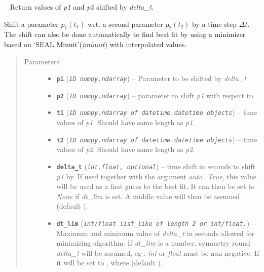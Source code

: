 \documentclass[letterpaper,10pt,english]{sphinxhowto}
\begin{document}

\begin{fulllineitems}
\label{swtools_doc:swtools.shift_param}~\label{swtools_doc:shift-param}
Return values of \emph{p1} and \emph{p2} shifted by \emph{delta\_t}.

Shift a parameter \(p_1(t_1)\) wrt. a second parameter
\(p_2(t_2)\) by a time step \(\Delta t\). The shift can
also be done automatically to find best fit by using a minimizer
based on `SEAL Minuit'(\emph{iminuit}) with interpolated values.
\begin{quote}\begin{description}
\item[{Parameters}] \leavevmode\begin{itemize}
\item {} 
\textbf{\texttt{p1}} (\emph{\texttt{1D numpy.ndarray}}) -- Parameter to be shifted by \emph{delta\_t}

\item {} 
\textbf{\texttt{p2}} (\emph{\texttt{1D numpy.ndarray}}) -- parameter to shift \emph{p1} with respect to.

\item {} 
\textbf{\texttt{t1}} (\emph{\texttt{1D numpy.ndarray of datetime.datetime objects}}) -- time values of \emph{p1}. Should have same length as \emph{p1}.

\item {} 
\textbf{\texttt{t2}} (\emph{\texttt{1D numpy.ndarray of datetime.datetime objects}}) -- time values of \emph{p2}. Should have same length as \emph{p2}.

\item {} 
\textbf{\texttt{delta\_t}} (\emph{\texttt{int,float, optional}}) -- time shift in seconds to shift \emph{p1} by. If used together with the
argument \emph{auto=True}, this value will be used as a first guess to
the best fit. It can then be set to \emph{None} if \emph{dt\_lim} is set.
A middle value will then be assumed (default ).

\item {} 
\textbf{\texttt{dt\_lim}} (\emph{\texttt{int/float list\_like of length 2 or int/float.}}) -- Maximum and minimum value of \emph{delta\_t} in seconds allowed for
minimizing algorithm. If \emph{dt\_lim} is a number, symmetry round
\emph{delta\_t} will be assumed, eg .
\emph{int} or \emph{float} must be non-negative. If  it
will be set to , where
 (default ).


\end{itemize}
\end{description}
\end{quote}
\end{fulllineitems}
\end{document}
